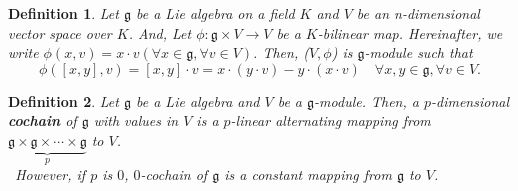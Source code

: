 \documentclass[titlepage,12pt]{article}
\newtheorem{defi}{Definition}[section]
\newcommand{\g}{\mathfrak{g}}
\begin{document}
\begin{defi}
Let $\mathfrak{g}$ be a Lie algebra on a field $K$ and $V$ be an n-dimensional vector space over $K$. And, Let $\phi :
\mathfrak{g} \times V \longrightarrow V$ be a $K$-bilinear map. Hereinafter, we write
$\phi(x,v)=x \cdot v(\forall x \in \g, \forall v \in V)$. Then, ($V,\phi$) is $\g$-module such that
\begin{equation*}
\phi([x,y],v) = [x,y] \cdot v = x \cdot (y \cdot v)-y \cdot (x
\cdot v) \quad \forall x,y \in \g, \forall v \in V.
\end{equation*}
\end{defi}

\begin{defi}
Let $\mathfrak{g}$ be a Lie algebra and $V$ be a $\mathfrak{g}$-module. Then, 
a $p$-dimensional \textbf{cochain} of $\mathfrak{g}$ with values in $V$ is a $p$-linear alternating mapping from 
$\underbrace{\mathfrak{g} \times \mathfrak{g} \times \cdots
\times \mathfrak{g}}_{p}$ to $V$. \\
\ However, if $p$ is $0$, $0$-cochain of $\mathfrak{g}$ is a constant mapping from $\mathfrak{g}$ to $V$.
\end{defi}
\end{document}

